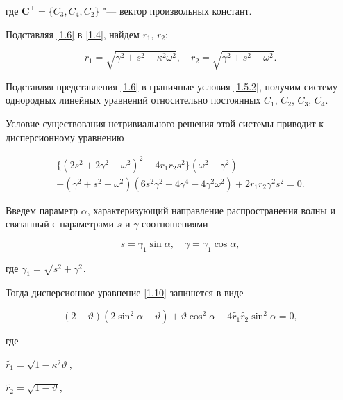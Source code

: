 где $\boldsymbol{C}^\top = \lbrace C_3, C_4, C_2\rbrace$ "--- вектор произвольных констант.

Подставляя \eqref{1.6} в \eqref{1.4}, найдем $ r_1$, $r_2$:

\begin{equation}

\label{1.7}

 r_1 = \sqrt{\gamma^2+s^2-\kappa^2\omega^2}, \quad  r_2 = \sqrt{\gamma^2+s^2-\omega^2} .

\end{equation}



Подставляя представления \eqref{1.6} в граничные условия \eqref{1.5.2}, получим систему однородных линейных уравнений относительно постоянных $C_1$, $C_2$, $C_3$, $C_4$. 

Условие существования нетривиального решения этой системы приводит к дисперсионному уравнению

\begin{multline}

\label{1.10}

\bigl\lbrace (2s^2 + 2\gamma^2 - \omega^2)^2 - 4r_1r_2s^2\bigr\rbrace (\omega^2 - \gamma^2) -  \\

-(\gamma^2 + s^2 - \omega^2)(6s^2 \gamma^2 + 4\gamma^4 - 4\gamma^2 \omega^2) + 2r_1r_2\gamma^2 s^2=0. 

\end{multline}

Введем параметр $\alpha$, характеризующий направление распространения волны и связанный с параметрами $s$ и $\gamma$ соотношениями 

$$s = \gamma_1 \sin \alpha,\quad  \gamma = \gamma_1 \cos \alpha,$$ 

где $\gamma_1 = \sqrt{s^2 + \gamma^2}$. 

Тогда дисперсионное уравнение \eqref{1.10} запишется в виде

\begin{equation}

\label{1.11}

(2 - \vartheta)(2 \sin^2 \alpha - \vartheta) + \vartheta\cos^2\alpha - 4\widetilde{r_1}\widetilde{r_2}\sin^2\alpha = 0,

\end{equation}

где 

$\widetilde{r_1} = \sqrt{1 - \kappa^2 \vartheta}$,

$\widetilde{r_2} = \sqrt{1 - \vartheta}$, 

